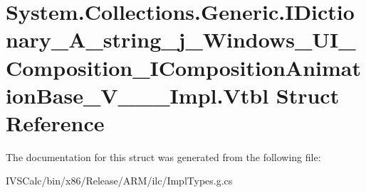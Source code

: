 \hypertarget{struct_system_1_1_collections_1_1_generic_1_1_i_dictionary___a__string__j___windows___u_i___compcb28c752038338bf18ae22d07eb2bca0}{}\section{System.\+Collections.\+Generic.\+I\+Dictionary\+\_\+\+A\+\_\+string\+\_\+j\+\_\+\+Windows\+\_\+\+U\+I\+\_\+\+Composition\+\_\+\+I\+Composition\+Animation\+Base\+\_\+\+V\+\_\+\+\_\+\+\_\+\+Impl.\+Vtbl Struct Reference}
\label{struct_system_1_1_collections_1_1_generic_1_1_i_dictionary___a__string__j___windows___u_i___compcb28c752038338bf18ae22d07eb2bca0}


The documentation for this struct was generated from the following file\+:\begin{DoxyCompactItemize}
\item 
I\+V\+S\+Calc/bin/x86/\+Release/\+A\+R\+M/ilc/Impl\+Types.\+g.\+cs\end{DoxyCompactItemize}
